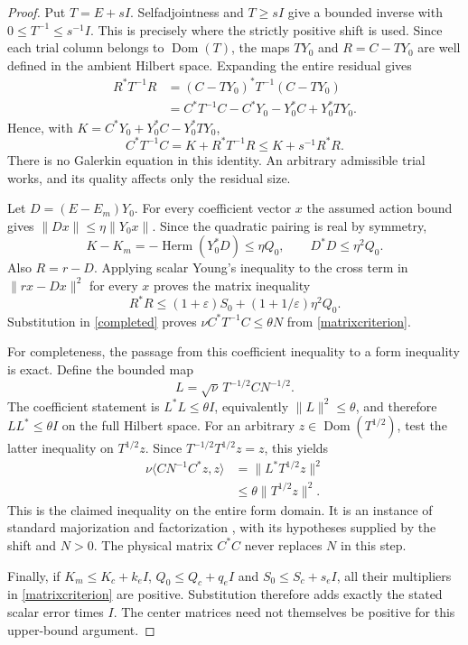 \documentclass[12pt]{article}
\theoremstyle{remark}\newtheorem{remark}[theorem]{Remark}
\newcommand{\Dom}{\operatorname{Dom}}
\begin{document}
\begin{proof}
Put $T=E+sI$. Selfadjointness and $T\ge sI$ give a bounded
inverse with $0\le T^{-1}\le s^{-1}I$. This is precisely where the
strictly positive shift is used. Since each trial column belongs to
$\Dom(T)$, the maps $TY_0$ and $R=C-TY_0$ are well defined in the
ambient Hilbert space. Expanding the entire residual gives
\begin{align*}
 R^*T^{-1}R
 &= (C-TY_0)^*T^{-1}(C-TY_0)\\
 &= C^*T^{-1}C-C^*Y_0-Y_0^*C+Y_0^*TY_0.
\end{align*}
Hence, with $K=C^*Y_0+Y_0^*C-Y_0^*TY_0$,
\begin{equation}\label{completed}
 C^*T^{-1}C=K+R^*T^{-1}R\le K+s^{-1}R^*R.
\end{equation}
There is no Galerkin equation in this identity. An arbitrary admissible
trial works, and its quality affects only the residual size.

Let $D=(E-E_m)Y_0$. For every coefficient vector $x$ the assumed
action bound gives $\|Dx\|\le\eta\|Y_0x\|$. Since the quadratic
pairing is real by symmetry,
\[
 K-K_m=-\operatorname{Herm}(Y_0^*D)\le\eta Q_0,
 \qquad D^*D\le\eta^2Q_0.
\]
Also $R=r-D$. Applying scalar Young's inequality to the cross term
in $\|rx-Dx\|^2$ for every $x$ proves the matrix inequality
\[
 R^*R\le(1+\varepsilon)S_0
                   +(1+1/\varepsilon)\eta^2Q_0.
\]
Substitution in \eqref{completed} proves
$\nu C^*T^{-1}C\le\theta N$ from \eqref{matrixcriterion}.

For completeness, the passage from this coefficient inequality to
a form inequality is exact. Define the bounded map
\[
 L=\sqrt\nu\,T^{-1/2}CN^{-1/2}.
\]
The coefficient statement is $L^*L\le\theta I$, equivalently
$\|L\|^2\le\theta$, and therefore $LL^*\le\theta I$ on the full
Hilbert space. For an arbitrary $z\in\Dom(T^{1/2})$, test the latter
inequality on $T^{1/2}z$. Since $T^{-1/2}T^{1/2}z=z$, this yields
\begin{align*}
 \nu\langle CN^{-1}C^*z,z\rangle
 &=\|L^*T^{1/2}z\|^2\\
 &\le\theta\|T^{1/2}z\|^2.
\end{align*}
This is the claimed inequality on the entire form domain. It is an
instance of standard majorization and factorization
\cite[Theorem 1]{Douglas}, with its hypotheses supplied by the shift
and $N>0$. The physical matrix $C^*C$ never replaces $N$ in this step.

Finally, if $K_m\le K_c+k_eI$, $Q_0\le Q_c+q_eI$ and
$S_0\le S_c+s_eI$, all their multipliers in
\eqref{matrixcriterion} are positive. Substitution therefore adds
exactly the stated scalar error times $I$. The center matrices need
not themselves be positive for this upper-bound argument.
\end{proof}
\end{document}
